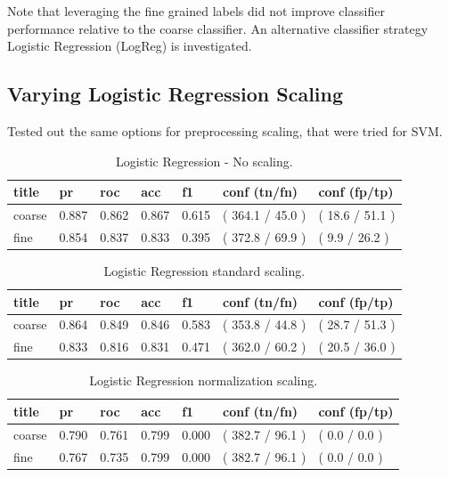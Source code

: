 \documentclass[ms]{nuthesis}
\begin{document}
\par Note that leveraging the fine grained labels did not improve classifier performance
relative to the coarse classifier. An alternative classifier strategy Logistic Regression
 (LogReg) is investigated.


\subsection{Varying Logistic Regression Scaling}
\par Tested out the same options for preprocessing scaling, that were tried for SVM.

\FloatBarrier
\begin{table}[H]
\centering
\begin{tabular}{|l||l||l||l||l||l||l|}\toprule
title & pr & roc & acc & f1 & conf (tn/fn) & conf (fp/tp) \\ \midrule
coarse & 0.887 & 0.862 & 0.867 & 0.615 & ( 364.1 / 45.0 ) & ( 18.6 / 51.1 ) \\
fine & 0.854 & 0.837 & 0.833 & 0.395 & ( 372.8 / 69.9 ) & ( 9.9 / 26.2 ) \\ \bottomrule
\end{tabular}
\caption{Logistic Regression - No scaling.}
\label{tab:LogRegDef}
\end{table}
\FloatBarrier

\FloatBarrier
\begin{table}[H]
\centering
\begin{tabular}{|l||l||l||l||l||l||l|}\toprule
title & pr & roc & acc & f1 & conf (tn/fn) & conf (fp/tp) \\ \midrule
coarse & 0.864 & 0.849 & 0.846 & 0.583 & ( 353.8 / 44.8 ) & ( 28.7 / 51.3 ) \\
fine & 0.833 & 0.816 & 0.831 & 0.471 & ( 362.0 / 60.2 ) & ( 20.5 / 36.0 ) \\ \bottomrule
\end{tabular}
\caption{Logistic Regression standard scaling.}
\label{tab:LogRegStandard}
\end{table}
\FloatBarrier

\FloatBarrier
\begin{table}[H]
\centering
\begin{tabular}{|l||l||l||l||l||l||l|}\toprule
title & pr & roc & acc & f1 & conf (tn/fn) & conf (fp/tp) \\ \midrule
coarse & 0.790 & 0.761 & 0.799 & 0.000 & ( 382.7 / 96.1 ) & ( 0.0 / 0.0 ) \\
fine & 0.767 & 0.735 & 0.799 & 0.000 & ( 382.7 / 96.1 ) & ( 0.0 / 0.0 ) \\ \bottomrule
\end{tabular}
\caption{Logistic Regression normalization scaling.}
\label{tab:LogRegNorm}
\end{table}
\FloatBarrier
\end{document}
